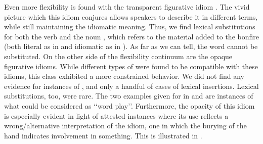 \documentclass[output=paper]{langsci/langscibook}
\begin{document}
Even\ili{} more\ili{} flexibility\ili{} is\ili{} found\ili{} with\ili{} the\ili{} transparent\ili{} figurative\ili{} idiom\ili{} \ili{}\idgloss{}\ili{}.\ili{} The\ili{} vivid\ili{} picture\ili{} which\ili{} this\ili{} idiom\ili{} conjures\ili{} allows\ili{} speakers\ili{} to\ili{} describe\ili{} it\ili{} in\ili{} different\ili{} terms\ili{},\ili{} while\ili{} still\ili{} maintaining\ili{} the\ili{} idiomatic\ili{} meaning\ili{}.\ili{} Thus\ili{},\ili{} we\ili{} find\ili{} lexical\ili{} substitutions\ili{} for\ili{} both\ili{} the\ili{} verb\ili{} \ili{}\hebgloss{}\ili{} and\ili{} the\ili{} noun\ili{} \ili{}\hebgloss{}\ili{},\ili{} which\ili{} refers\ili{} to\ili{} the\ili{} material\ili{} added\ili{} to\ili{} the\ili{} bonfire\ili{} \ili{}(both\ili{} literal\ili{} as\ili{} in\ili{} \ili{}\ili{} and\ili{} idiomatic\ili{} as\ili{} in\ili{} \ili{}\ili{})\ili{}.\ili{} As\ili{} far\ili{} as\ili{} we\ili{} can\ili{} tell\ili{},\ili{} the\ili{} word\ili{} \ili{}\hebgloss{}\ili{} cannot\ili{} be\ili{} substituted\ili{}.\ili{}
\ili{}
On\ili{} the\ili{} other\ili{} side\ili{} of\ili{} the\ili{} flexibility\ili{} continuum\ili{} are\ili{} the\ili{} opaque\ili{} figurative\ili{} idioms\ili{}.\ili{} While\ili{} different\ili{} types\ili{} of\ili{} \ili{}\isi{}\ili{} were\ili{} found\ili{} to\ili{} be\ili{} compatible\ili{} with\ili{} these\ili{} idioms\ili{},\ili{} this\ili{} class\ili{} exhibited\ili{} a\ili{} more\ili{} constrained\ili{} behavior\ili{}.\ili{} We\ili{} did\ili{} not\ili{} find\ili{} any\ili{} evidence\ili{} for\ili{} instances\ili{} of\ili{} \ili{}\isi{}\ili{},\ili{} and\ili{} only\ili{} a\ili{} handful\ili{} of\ili{} cases\ili{} of\ili{} lexical\ili{} insertions\ili{}.\ili{} Lexical\ili{} substitutions\ili{},\ili{} too\ili{},\ili{} were\ili{} rare\ili{}.\ili{} The\ili{} two\ili{} examples\ili{} given\ili{} for\ili{} \ili{}\idgloss{}\ili{} in\ili{} \ili{}\ili{} and\ili{} \ili{}\ili{} are\ili{} instances\ili{} of\ili{} what\ili{} could\ili{} be\ili{} considered\ili{} as\ili{} \ili{}`\ili{}`word\ili{} play\ili{}'\ili{}'\ili{}.\ili{} Furthermore\ili{},\ili{} the\ili{} opacity\ili{} of\ili{} this\ili{} idiom\ili{} is\ili{} especially\ili{} evident\ili{} in\ili{} light\ili{} of\ili{} attested\ili{} instances\ili{} where\ili{} its\ili{} use\ili{} reflects\ili{} a\ili{} wrong\ili{}/alternative\ili{} interpretation\ili{} of\ili{} the\ili{} idiom\ili{},\ili{} one\ili{} in\ili{} which\ili{} the\ili{} burying\ili{} of\ili{} the\ili{} hand\ili{} indicates\ili{} involvement\ili{} in\ili{} something\ili{}.\ili{} This\ili{} is\ili{} illustrated\ili{} in\ili{} \ili{}\ili{}.\ili{}
\end{document}
